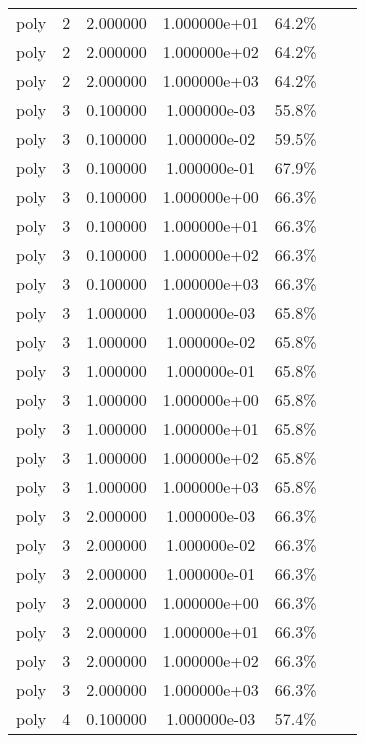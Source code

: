 \documentclass[11pt,spanish,listoffigures,listoftables]{tfgetsinf}
\begin{document}
\begin{table}
\begin{tabular}{l*{5}{c}r}
 poly & 2 & 2.000000 & 1.000000e+01 & 64.2\%\\
 poly & 2 & 2.000000 & 1.000000e+02 & 64.2\%\\
 poly & 2 & 2.000000 & 1.000000e+03 & 64.2\%\\
 poly & 3 & 0.100000 & 1.000000e-03 & 55.8\%\\
 poly & 3 & 0.100000 & 1.000000e-02 & 59.5\%\\
 poly & 3 & 0.100000 & 1.000000e-01 & 67.9\%\\
 poly & 3 & 0.100000 & 1.000000e+00 & 66.3\%\\
 poly & 3 & 0.100000 & 1.000000e+01 & 66.3\%\\
 poly & 3 & 0.100000 & 1.000000e+02 & 66.3\%\\
 poly & 3 & 0.100000 & 1.000000e+03 & 66.3\%\\
 poly & 3 & 1.000000 & 1.000000e-03 & 65.8\%\\
 poly & 3 & 1.000000 & 1.000000e-02 & 65.8\%\\
 poly & 3 & 1.000000 & 1.000000e-01 & 65.8\%\\
 poly & 3 & 1.000000 & 1.000000e+00 & 65.8\%\\
 poly & 3 & 1.000000 & 1.000000e+01 & 65.8\%\\
 poly & 3 & 1.000000 & 1.000000e+02 & 65.8\%\\
 poly & 3 & 1.000000 & 1.000000e+03 & 65.8\%\\
 poly & 3 & 2.000000 & 1.000000e-03 & 66.3\%\\
 poly & 3 & 2.000000 & 1.000000e-02 & 66.3\%\\
 poly & 3 & 2.000000 & 1.000000e-01 & 66.3\%\\
 poly & 3 & 2.000000 & 1.000000e+00 & 66.3\%\\
 poly & 3 & 2.000000 & 1.000000e+01 & 66.3\%\\
 poly & 3 & 2.000000 & 1.000000e+02 & 66.3\%\\
 poly & 3 & 2.000000 & 1.000000e+03 & 66.3\%\\
 poly & 4 & 0.100000 & 1.000000e-03 & 57.4\%\\
\end{tabular}
\end{table}
\end{document}
